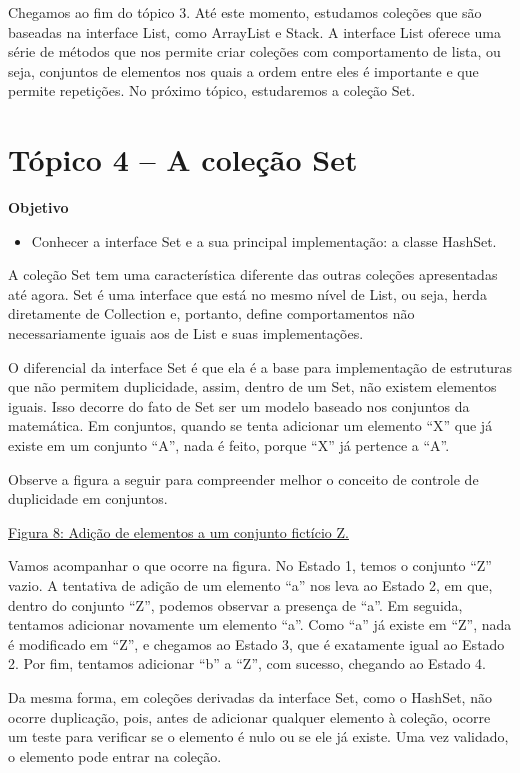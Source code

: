 \documentclass[11pt]{article}
\begin{document}
Chegamos ao fim do tópico 3. Até este momento, estudamos coleções que são baseadas na interface List, como ArrayList e Stack. A interface List oferece uma série de métodos que nos permite criar coleções com comportamento de lista, ou seja, conjuntos de elementos nos quais a ordem entre eles é importante e que permite repetições. No próximo tópico, estudaremos a coleção Set.

\section{Tópico 4 – A coleção Set}
\label{sec:org71b583c}
\textbf{Objetivo}
\begin{itemize}
\item Conhecer a interface Set e a sua principal implementação: a classe HashSet.
\end{itemize}

A coleção Set tem uma característica diferente das outras coleções apresentadas até agora. Set é uma interface que está no mesmo nível de List, ou seja, herda diretamente de Collection e, portanto, define comportamentos não necessariamente iguais aos de List e suas implementações.

O diferencial da interface Set é que ela é a base para implementação de estruturas que não permitem duplicidade, assim, dentro de um Set, não existem elementos iguais. Isso decorre do fato de Set ser um modelo baseado nos conjuntos da matemática. Em conjuntos, quando se tenta adicionar um elemento “X” que já existe em um conjunto “A”, nada é feito, porque “X” já pertence a “A”.

Observe a figura a seguir para compreender melhor o conceito de controle de duplicidade em conjuntos.

\href{figura8.png}{Figura 8: Adição de elementos a um conjunto fictício Z.}

Vamos acompanhar o que ocorre na figura. No Estado 1, temos o conjunto “Z” vazio. A tentativa de adição de um elemento “a” nos leva ao Estado 2, em que, dentro do conjunto “Z”, podemos observar a presença de “a”. Em seguida, tentamos adicionar novamente um elemento “a”. Como “a” já existe em “Z”, nada é modificado em “Z”, e chegamos ao Estado 3, que é exatamente igual ao Estado 2. Por fim, tentamos adicionar “b” a “Z”, com sucesso, chegando ao Estado 4.

Da mesma forma, em coleções derivadas da interface Set, como o HashSet, não ocorre duplicação, pois, antes de adicionar qualquer elemento à coleção, ocorre um teste para verificar se o elemento é nulo ou se ele já existe. Uma vez validado, o elemento pode entrar na coleção.
\end{document}
